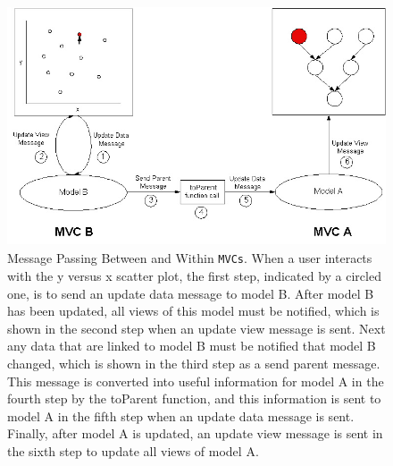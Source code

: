 \documentclass[11pt]{article}
\newcommand{\Rfunction}[1]{{\textsf{#1}}}
\newcommand{\Robject}[1]{{\texttt{#1}}}
\begin{document}
\begin{figure}[ht]
  \begin{center}
    \includegraphics[height=2.8in, width=4.5in]{newMP.jpg}
    \caption{ Message Passing Between and Within \Robject{MVCs}.  When a user
      interacts with the y versus x scatter plot, the first step, indicated by
      a circled one, is to send an update data message to model B.  After
      model B has been updated, all views of this model must be notified, which
      is shown in the second step when an update view message is sent.  Next
      any data that are linked to model B must be notified that model B
      changed, which is shown in the third step as a send parent message.
      This message is converted into useful information for model A in
      the fourth step by the \Rfunction{toParent} function, and this
      information is sent to model A in the fifth step when an update data
      message is sent.  Finally, after model A is updated, an update view
      message is sent in the sixth step to update all views of model A. }
    \label{Fig:MessPass}
  \end{center}
\end{figure}

\end{document}
